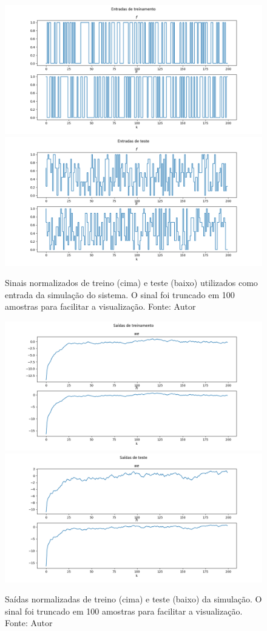 \begin{figure}[hbt!]
    \centering
    \includegraphics[width=0.8\linewidth]{Imagens/chap04/simulation_inputs_train.png}
    \hfill
    \includegraphics[width=0.8\linewidth]{Imagens/chap04/simulation_inputs_test.png}
    \caption{Sinais normalizados de treino (cima) e teste (baixo) utilizados como entrada da simulação do sistema.
 O sinal foi truncado em 100 amostras para facilitar a visualização. Fonte: Autor}
    \label{fig:sim_inputs}
\end{figure}

\begin{figure}[hbt!]
    \centering
    \includegraphics[width=0.8\linewidth]{Imagens/chap04/simulation_outputs_train.png}
    \hfill
    \includegraphics[width=0.8\linewidth]{Imagens/chap04/simulation_outputs_test.png}
    \caption{Saídas normalizadas de treino (cima) e teste (baixo) da simulação. O sinal foi truncado em 100 amostras para facilitar a visualização. Fonte: Autor}
    \label{fig:sim_outputs}
\end{figure}

